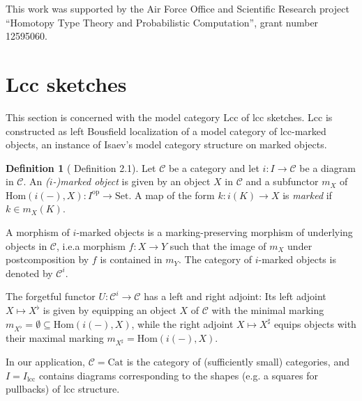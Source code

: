 \documentclass[a4paper]{article}
\theoremstyle{remark}
\theoremstyle{definition}
\newtheorem{definition}[theorem]{Definition}
\begin{document}
This work was supported by the Air Force Office and Scientific Research project ``Homotopy Type Theory and Probabilistic Computation'', grant number 12595060.

\section{Lcc sketches}
\label{sec:lcc-sketches}

This section is concerned with the model category $\mathrm{Lcc}$ of lcc sketches.
$\mathrm{Lcc}$ is constructed as left Bousfield localization of a model category of lcc-marked objects, an instance of Isaev's model category structure on marked objects.

\begin{definition}[\citet{marked-objects} Definition 2.1]
  Let $\mathcal{C}$ be a category and let $i : I \rightarrow \mathcal{C}$ be a diagram in $\mathcal{C}$.
  An \emph{($i$-)marked object} is given by an object $X$ in $\mathcal{C}$ and a subfunctor $m_X$ of $\mathrm{Hom}(i(-), X) : I^\mathrm{op} \rightarrow \mathrm{Set}$.
  A map of the form $k : i(K) \rightarrow X$ is \emph{marked} if $k \in m_X(K)$.

  A morphism of $i$-marked objects is a marking-preserving morphism of underlying objects in $\mathcal{C}$, i.e.\@ a morphism $f : X \rightarrow Y$ such that the image of $m_X$ under postcomposition by $f$ is contained in $m_Y$.
  The category of $i$-marked objects is denoted by $\mathcal{C}^i$.
\end{definition}

The forgetful functor $U : \mathcal{C}^i \rightarrow \mathcal{C}$ has a left and right adjoint:
Its left adjoint $X \mapsto X^\flat$ is given by equipping an object $X$ of $\mathcal{C}$ with the minimal marking $m_{X^\flat} = \emptyset \subseteq \mathrm{Hom}(i(-), X)$, while the right adjoint $X \mapsto X^\sharp$ equips objects with their maximal marking $m_{X^\sharp} = \mathrm{Hom}(i(-), X)$.

In our application, $\mathcal{C} = \mathrm{Cat}$ is the category of (sufficiently small) categories, and $I = I_\mathrm{lcc}$ contains diagrams corresponding to the shapes (e.g. a squares for pullbacks) of lcc structure.
\end{document}

